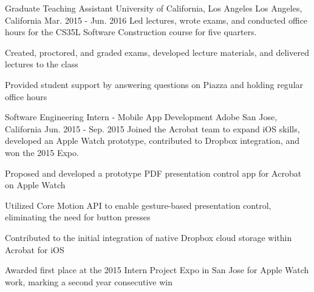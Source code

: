 
%
% 
% 
%
%
%
%
%
% 

\begin{cventries}

\cventry
    {Graduate Teaching Assistant} %
    {University of California, Los Angeles} %
    {Los Angeles, California} %
    {Mar. 2015 - Jun. 2016} %
    {Led lectures, wrote exams, and conducted office hours for the CS35L Software Construction course for five quarters.} %
    {
      \begin{cvitems} %
        \item {Created, proctored, and graded exams, developed lecture materials, and delivered lectures to the class}
        \item {Provided student support by answering questions on Piazza and holding regular office hours}
      \end{cvitems}
    }

\cventry
    {Software Engineering Intern - Mobile App Development} %
    {Adobe} %
    {San Jose, California} %
    {Jun. 2015 - Sep. 2015} %
    {Joined the Acrobat team to expand iOS skills, developed an Apple Watch prototype, contributed to Dropbox integration, and won the 2015 Expo.} %
    {
      \begin{cvitems} %
        \item {Proposed and developed a prototype PDF presentation control app for Acrobat on Apple Watch}
        \item {Utilized Core Motion API to enable gesture-based presentation control, eliminating the need for button presses}
        \item {Contributed to the initial integration of native Dropbox cloud storage within Acrobat for iOS}
        \item {Awarded first place at the 2015 Intern Project Expo in San Jose for Apple Watch work, marking a second year consecutive win}
      \end{cvitems}
    }


\end{cventries}
